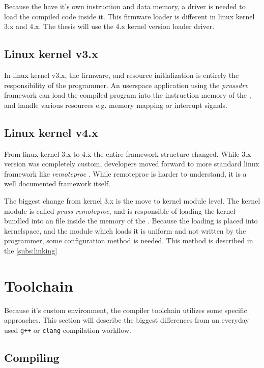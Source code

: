 Because the \pru have it's own instruction and data memory, a driver is needed to load the compiled code inside it. This firmware loader is different in linux kernel 3.x and 4.x. The thesis will use the 4.x kernel version loader driver.

\subsection{Linux kernel v3.x}

In linux kernel v3.x, the firmware, and resource initialization is entirely the responsibility of the programmer. An userspace application using the \emph{prussdrv} \citep{PRU_PRUSSDRV} framework can load the compiled program into the instruction memory of the \pru, and handle various resources e.g. memory mapping or interrupt signals.

\subsection{Linux kernel v4.x}

From linux kernel 3.x to 4.x the entire framework structure changed. While 3.x version was completely custom, \ti developers moved forward to more standard linux framework like \emph{remoteproc} \citep{RPROC}. While remoteproc is harder to understand, it is a well documented framework itself.

The biggest change from kernel 3.x is the move to kernel module level. The kernel module is called \emph{pruss-remoteproc}, and is responsible of loading the kernel bundled into an \elf file inside the memory of the \pru. Because the loading is placed into kernelspace, and the module which loads it is uniform and not written by the programmer, some configuration method is needed. This method is described in the \cref{subs:linking}

\section{Toolchain}

Because it's custom environment, the compiler toolchain utilizes some specific approaches. This section will describe the biggest differences from an everyday used \verb/g++/ or \verb/clang/ compilation workflow.

\subsection{Compiling}

